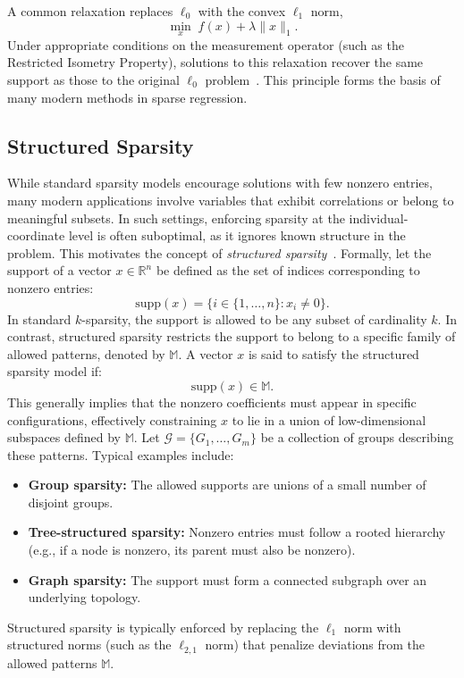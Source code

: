 \documentclass[12pt]{article}
\begin{document}
A common relaxation replaces $\ell_0$ with the convex $\ell_1$ norm,
\[
\min_x \; f(x) + \lambda \|x\|_1.
\]
Under appropriate conditions on the measurement operator (such as the Restricted Isometry Property), solutions to this relaxation recover the same support as those to the original $\ell_0$ problem~\cite{BDL}. This principle forms the basis of many modern methods in sparse regression.


\subsection{Structured Sparsity}

While standard sparsity models encourage solutions with few nonzero entries, many modern applications involve variables that exhibit correlations or belong to meaningful subsets. In such settings, enforcing sparsity at the individual-coordinate level is often suboptimal, as it ignores known structure in the problem. This motivates the concept of \textit{structured sparsity}~\cite{Baraniuk}.
Formally, let the support of a vector $x \in \mathbb{R}^n$ be defined as the set of indices corresponding to nonzero entries:
\[
    \text{supp}(x) = \{ i \in \{1,\dots,n\} : x_i \neq 0 \}.
\]
In standard $k$-sparsity, the support is allowed to be any subset of cardinality $k$. In contrast, structured sparsity restricts the support to belong to a specific family of allowed patterns, denoted by $\mathbb{M}$. A vector $x$ is said to satisfy the structured sparsity model if:
\[
    \text{supp}(x) \in \mathbb{M}.
\]
This generally implies that the nonzero coefficients must appear in specific configurations, effectively constraining $x$ to lie in a union of low-dimensional subspaces defined by $\mathbb{M}$.
Let $\mathcal{G} = \{G_1, \dots, G_m\}$ be a collection of groups describing these patterns. Typical examples include:
\begin{itemize}
    \item \textbf{Group sparsity:} The allowed supports are unions of a small number of disjoint groups.
    \item \textbf{Tree-structured sparsity:} Nonzero entries must follow a rooted hierarchy (e.g., if a node is nonzero, its parent must also be nonzero).
    \item \textbf{Graph sparsity:} The support must form a connected subgraph over an underlying topology.
\end{itemize}
Structured sparsity is typically enforced by replacing the $\ell_1$ norm with structured norms (such as the $\ell_{2,1}$ norm) that penalize deviations from the allowed patterns $\mathbb{M}$.
\end{document}
